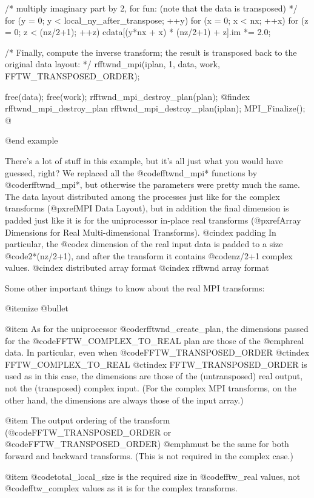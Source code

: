 {     /* multiply imaginary part by 2, for fun:
        (note that the data is transposed) */
     for (y = 0; y < local_ny_after_transpose; ++y)
             for (x = 0; x < nx; ++x)
                     for (z = 0; z < (nz/2+1); ++z)
                             cdata[(y*nx + x) * (nz/2+1) + z].im
                                     *= 2.0;

     /* Finally, compute the inverse transform; the result
        is transposed back to the original data layout: */
     rfftwnd_mpi(iplan, 1, data, work, FFTW_TRANSPOSED_ORDER);

     free(data);
     free(work);
     rfftwnd_mpi_destroy_plan(plan);
@findex rfftwnd_mpi_destroy_plan
     rfftwnd_mpi_destroy_plan(iplan);
     MPI_Finalize();
@}
@end example

There's a lot of stuff in this example, but it's all just what you would
have guessed, right?  We replaced all the @code{fftwnd_mpi*} functions
by @code{rfftwnd_mpi*}, but otherwise the parameters were pretty much
the same.  The data layout distributed among the processes just like for
the complex transforms (@pxref{MPI Data Layout}), but in addition the
final dimension is padded just like it is for the uniprocessor in-place
real transforms (@pxref{Array Dimensions for Real Multi-dimensional
Transforms}).
@cindex padding
In particular, the @code{z} dimension of the real input data is padded
to a size @code{2*(nz/2+1)}, and after the transform it contains
@code{nz/2+1} complex values.
@cindex distributed array format
@cindex rfftwnd array format

Some other important things to know about the real MPI transforms:

@itemize @bullet

@item
As for the uniprocessor @code{rfftwnd_create_plan}, the dimensions
passed for the @code{FFTW_COMPLEX_TO_REAL} plan are those of the
@emph{real} data.  In particular, even when @code{FFTW_TRANSPOSED_ORDER}
@ctindex FFTW_COMPLEX_TO_REAL
@ctindex FFTW_TRANSPOSED_ORDER
is used as in this case, the dimensions are those of the (untransposed)
real output, not the (transposed) complex input.  (For the complex MPI
transforms, on the other hand, the dimensions are always those of the
input array.)

@item
The output ordering of the transform (@code{FFTW_TRANSPOSED_ORDER} or
@code{FFTW_TRANSPOSED_ORDER}) @emph{must} be the same for both forward
and backward transforms.  (This is not required in the complex case.)

@item
@code{total_local_size} is the required size in @code{fftw_real} values,
not @code{fftw_complex} values as it is for the complex transforms.

